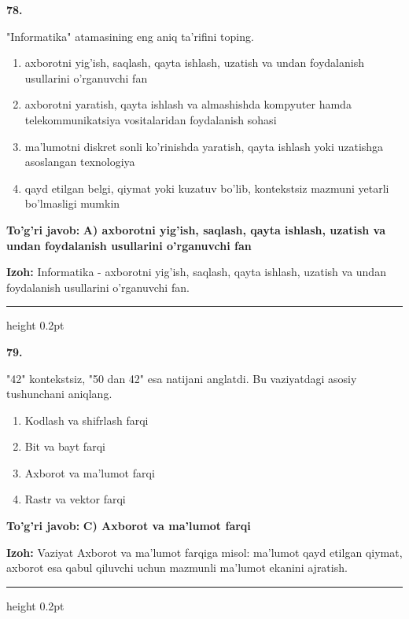 \documentclass[10pt,a4paper,oneside]{article}
\begin{document}
\noindent\textbf{\color{ink}78.}
\par
"Informatika" atamasining eng aniq ta'rifini toping.
\begin{enumerate}[label=\Alph*),leftmargin=9mm]
\item axborotni yig'ish, saqlash, qayta ishlash, uzatish va undan foydalanish usullarini o'rganuvchi fan
\item axborotni yaratish, qayta ishlash va almashishda kompyuter hamda telekommunikatsiya vositalaridan foydalanish sohasi
\item ma'lumotni diskret sonli ko'rinishda yaratish, qayta ishlash yoki uzatishga asoslangan texnologiya
\item qayd etilgan belgi, qiymat yoki kuzatuv bo'lib, kontekstsiz mazmuni yetarli bo'lmasligi mumkin
\end{enumerate}
\begin{tcolorbox}[enhanced,breakable,colback=teal!4,colframe=teal!50!black,boxrule=0.5pt,arc=1.1mm,left=3mm,right=3mm,top=1.7mm,bottom=1.7mm,before skip=2mm,after skip=2mm]
\textbf{\color{teal}To'g'ri javob:} \textbf{A) axborotni yig'ish, saqlash, qayta ishlash, uzatish va undan foydalanish usullarini o'rganuvchi fan}
\par\smallskip
\textbf{Izoh:} Informatika - axborotni yig'ish, saqlash, qayta ishlash, uzatish va undan foydalanish usullarini o'rganuvchi fan.
\end{tcolorbox}
\vspace{2mm}\hrule height 0.2pt \vspace{3mm}

\noindent\textbf{\color{ink}79.}
\par
"42" kontekstsiz, "50 dan 42" esa natijani anglatdi. Bu vaziyatdagi asosiy tushunchani aniqlang.
\begin{enumerate}[label=\Alph*),leftmargin=9mm]
\item Kodlash va shifrlash farqi
\item Bit va bayt farqi
\item Axborot va ma'lumot farqi
\item Rastr va vektor farqi
\end{enumerate}
\begin{tcolorbox}[enhanced,breakable,colback=teal!4,colframe=teal!50!black,boxrule=0.5pt,arc=1.1mm,left=3mm,right=3mm,top=1.7mm,bottom=1.7mm,before skip=2mm,after skip=2mm]
\textbf{\color{teal}To'g'ri javob:} \textbf{C) Axborot va ma'lumot farqi}
\par\smallskip
\textbf{Izoh:} Vaziyat Axborot va ma'lumot farqiga misol: ma'lumot qayd etilgan qiymat, axborot esa qabul qiluvchi uchun mazmunli ma'lumot ekanini ajratish.
\end{tcolorbox}
\vspace{2mm}\hrule height 0.2pt \vspace{3mm}
\end{document}
